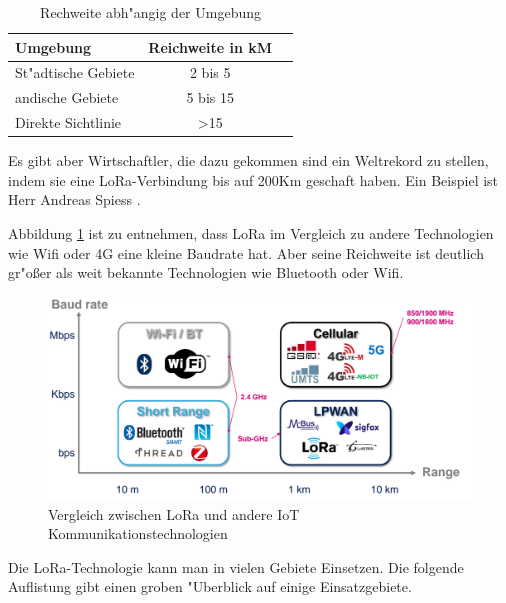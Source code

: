 \begin{center}
	\begin{table}[htbp] 
		\centering 
		\Large
		\begin{tabular}{l|c|r}
			\textbf{Umgebung} & \textbf{Reichweite in kM} \\
			\hline
			St"adtische Gebiete	& 2 bis 5 \\
			\hline
			andische Gebiete & 5 bis 15\\
			\hline
			Direkte Sichtlinie	& >15 
		\end{tabular} 
		\caption{Rechweite abh"angig der Umgebung} 
		\label{tab:Range} 
		
	\end{table}
\end{center}

Es gibt aber Wirtschaftler, die dazu gekommen sind ein Weltrekord zu stellen, indem sie eine LoRa-Verbindung bis auf 200Km geschaft haben. Ein Beispiel ist Herr Andreas Spiess \cite{AndreasSpiess}.

Abbildung \ref{fig:Netz} ist zu entnehmen, dass LoRa im Vergleich zu andere Technologien wie Wifi oder 4G eine kleine Baudrate hat. Aber seine Reichweite ist deutlich gr"o\ss{}er als weit bekannte Technologien wie Bluetooth oder Wifi.


\begin{figure}[h]
	\centering
	\includegraphics[width=14cm]{source/images/Communications_tech}
	\caption{Vergleich zwischen LoRa und andere IoT Kommunikationstechnologien \cite{LoRaWAN}\label{fig:Netz}}
\end{figure}

\vspace{2cm}
Die LoRa-Technologie kann man in vielen Gebiete Einsetzen. Die folgende Auflistung gibt einen groben "Uberblick auf einige Einsatzgebiete.

